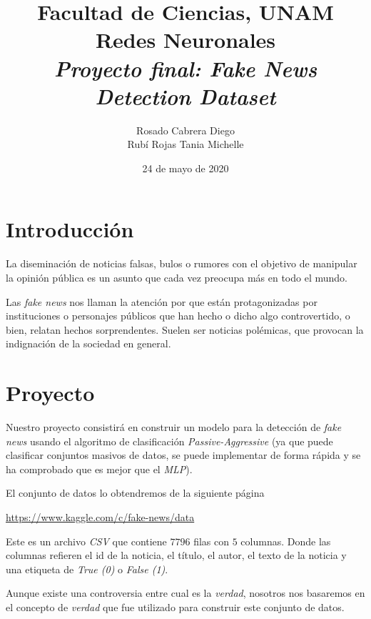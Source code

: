 \documentclass[letterpaper,12pt]{article}
\title{Facultad de Ciencias, UNAM \\ Redes Neuronales \\ 
       \textit{Proyecto final: Fake News Detection Dataset}}
\author{Rosado Cabrera Diego \\
        Rubí Rojas Tania Michelle}
\date{24 de mayo de 2020}
\begin{document}
\maketitle

\section{Introducción}

La diseminación de noticias falsas, bulos o rumores con el objetivo de 
manipular la opinión pública es un asunto que cada vez preocupa más en todo el 
mundo. 

Las \textit{fake news} nos llaman la atención por que están protagonizadas por 
instituciones o personajes públicos que han hecho o dicho algo controvertido,
o bien, relatan hechos sorprendentes. Suelen ser noticias polémicas, que provocan
la indignación de la sociedad en general. 


\section{Proyecto}
Nuestro proyecto consistirá en construir un modelo para la detección de 
\textit{fake news} usando el algoritmo de clasificación 
\textit{Passive-Aggressive} (ya que puede clasificar conjuntos masivos de datos, 
se puede implementar de forma rápida y se ha comprobado que es mejor que el 
\textit{MLP}). 

El conjunto de datos lo obtendremos de la siguiente página
\begin{center}
        \url{https://www.kaggle.com/c/fake-news/data}
\end{center}

Este es un archivo \textit{CSV} que contiene $7796$ filas con $5$ columnas. 
Donde las columnas refieren el id de la noticia, el título, el autor, el texto 
de la noticia y una etiqueta de \textit{True (0)} o \textit{False (1)}. 

Aunque existe una controversia entre cual es la \textit{verdad}, nosotros nos 
basaremos en el concepto de \textit{verdad} que fue utilizado para construir 
este conjunto de datos. 
\end{document}
